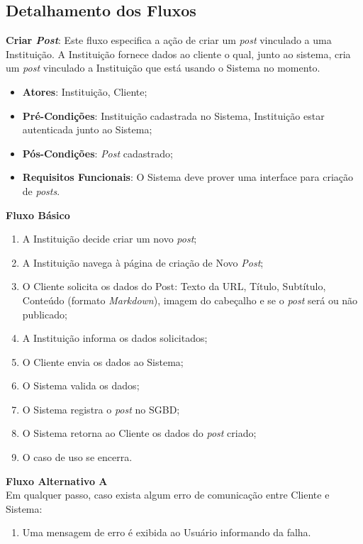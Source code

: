 \begin{anexosenv}
\subsection*{Detalhamento dos Fluxos}
\begin{lista}
  \item \textbf{Criar \emph{Post}}: Este fluxo especifica a ação de criar um \emph{post} vinculado a uma Instituição. A Instituição fornece dados ao cliente o qual, junto ao sistema, cria um \emph{post} vinculado a Instituição que está usando o Sistema no momento.
    \begin{itemize}
    \item \textbf{Atores}: Instituição, Cliente;
    \item \textbf{Pré-Condições}: Instituição cadastrada no Sistema, Instituição estar autenticada junto ao Sistema;
    \item \textbf{Pós-Condições}: \emph{Post} cadastrado;
    \item \textbf{Requisitos Funcionais}: O Sistema deve prover uma interface para criação de \emph{posts}.
    \end{itemize}
	
    \textbf{Fluxo Básico}
    \begin{enumerate}
    \item A Instituição decide criar um novo \emph{post};
    \item A Instituição navega à página de criação de Novo \emph{Post};
    \item O Cliente solicita os dados do Post: Texto da URL, Título, Subtítulo, Conteúdo (formato \emph{Markdown}), imagem do cabeçalho e se o \emph{post} será ou não publicado;
    \item A Instituição informa os dados solicitados;
    \item O Cliente envia os dados ao Sistema;
    \item O Sistema valida os dados;
    \item O Sistema registra o \emph{post} no SGBD;
    \item O Sistema retorna ao Cliente os dados do \emph{post} criado;
    \item O caso de uso se encerra.
    \end{enumerate}
    
    \textbf{Fluxo Alternativo A} \\
    Em qualquer passo, caso exista algum erro de comunicação entre Cliente e Sistema:
    \begin{enumerate}
    \item Uma mensagem de erro é exibida ao Usuário informando da falha.
    \end{enumerate}
    

\end{lista}
\end{anexosenv}
